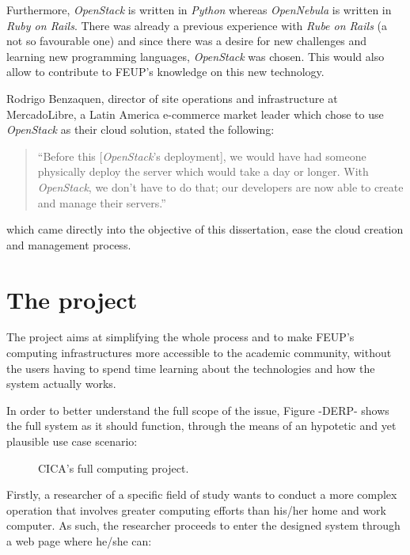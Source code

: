 Furthermore, \textit{OpenStack} is written in \textit{Python} whereas \textit{OpenNebula} is written in \textit{Ruby on Rails}. There was already a previous experience with \textit{Rube on Rails} (a not so favourable one) and since there was a desire for new challenges and learning new programming languages, \textit{OpenStack} was chosen. This would also allow to contribute to FEUP's knowledge on this new technology.

Rodrigo Benzaquen, director of site operations and infrastructure at MercadoLibre, a Latin America e-commerce market leader which chose to use \textit{OpenStack} as their cloud solution, stated the following:

\begin{quote}
 ``Before this [\textit{OpenStack}'s deployment], we would have had someone physically deploy the server which would take a day or longer. With \textit{OpenStack}, we don't have to do that; our developers are now able to create and manage their servers.''\cite{openstack_userstories}
\end{quote}

which came directly into the objective of this dissertation, ease the cloud creation and management process.

\section{The project} \label{sec:project}


The project aims at simplifying the whole process and to make FEUP's computing infrastructures more accessible to the academic community, without the users having to spend time learning about the technologies and how the system actually works.

In order to better understand the full scope of the issue, Figure -DERP- shows the full system as it should function, through the means of an hypotetic and yet plausible use case scenario:

\begin{figure}[t]
  \begin{center}
    \leavevmode
    \caption{CICA's full computing project.}
    \label{fig:big_picture}
  \end{center}
\end{figure}

Firstly, a researcher of a specific field of study wants to conduct a more complex operation that involves greater computing efforts than his/her home and work computer. As such, the researcher proceeds to enter the designed system through a web page where he/she can:

